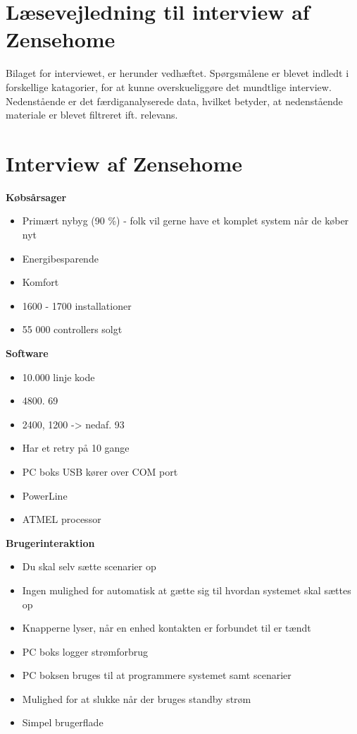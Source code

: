 \label{sec:zensehome_interview}
\section*{Læsevejledning til interview af Zensehome}
Bilaget for interviewet, er herunder vedhæftet. Spørgsmålene er blevet indledt i forskellige katagorier, for at kunne overskueliggøre det mundtlige interview. Nedenstående er det færdiganalyserede data, hvilket betyder, at nedenstående materiale er blevet filtreret ift. relevans. \\

\section*{Interview af Zensehome}
{\bf Købsårsager} \\
\begin{itemize}
    \item Primært nybyg (90 \%) - folk vil gerne have et komplet system når de køber nyt
    \item Energibesparende
    \item Komfort
    \item 1600 - 1700 installationer
    \item 55 000 controllers solgt
\end{itemize}

{\bf Software}
\begin{itemize}
    \item 10.000 linje kode
    \item 4800. 69%
    \item 2400, 1200 -> nedaf. 93%
    \item Har et retry på 10 gange
    \item PC boks USB kører over COM port
    \item PowerLine
    \item ATMEL processor
\end{itemize}

{\bf Brugerinteraktion}
\begin{itemize}
    \item Du skal selv sætte scenarier op
    \item Ingen mulighed for automatisk at gætte sig til hvordan systemet skal sættes op
    \item Knapperne lyser, når en enhed kontakten er forbundet til er tændt
    \item PC boks logger strømforbrug
    \item PC boksen bruges til at programmere systemet samt scenarier
    \item Mulighed for at slukke når der bruges standby strøm
    \item Simpel brugerflade
\end{itemize}

